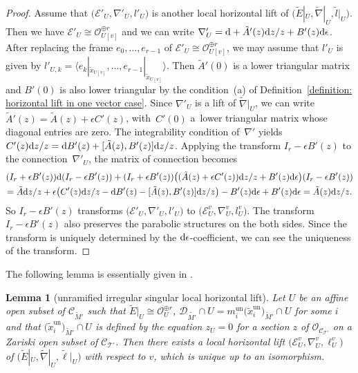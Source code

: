 \documentclass[pdftex]{sigma}
\numberwithin{equation}{section}
\newtheorem{Lemma}[Theorem]{Lemma}
\begin{document}
\begin{proof}
Assume that
$\big({\mathcal E'}_U,\nabla'_U,l'_U\big)$ is another local horizontal lift of
$\big(\tilde{E}|_U,\tilde{\nabla}|_U,\tilde{l}|_U\big)$.
Then we have ${\mathcal E'}_U\cong{\mathcal O}_{U[v]}^{\oplus r}$
and we can write $\nabla'_U={\rm d}+\tilde{A}'(z){\rm d}z/z+B'(z){\rm d}\epsilon$.
After replacing the frame $e_0,\dots,e_{r-1}$
of ${\mathcal E'}_U\cong{\mathcal O}_{U[v]}^{\oplus r}$,
we may assume that $l'_U$ is given by
$l'_{U,k}=\langle e_k|_{\tilde{x}_{U[v]}},\dots,e_{r-1}|_{\tilde{x}_{U[v]}}\rangle$.
Then $\tilde{A}'(0)$ is a lower triangular matrix and
$B'(0)$ is also lower triangular by the condition~(a) of
Definition~\ref{definition: horizontal lift in one vector case}.
Since $\nabla'_U$ is a lift of $\tilde{\nabla}|_U$,
we can write $\tilde{A}'(z)=\tilde{A}(z)+\epsilon C'(z)$,
with~$C'(0)$ a~lower triangular matrix whose diagonal entries are zero.
The integrability condition of~$\nabla'$ yields
$C'(z){\rm d}z/z={\rm d}B'(z)+[\tilde{A}(z),B'(z)]{\rm d}z/z$.
Applying the transform $I_r-\epsilon B'(z)$ to the connection~$\nabla'_U$,
the matrix of connection becomes
\begin{gather*}
 (I_r+\epsilon B'(z)){\rm d}(I_r-\epsilon B'(z))
 +(I_r+\epsilon B'(z))\big( (\tilde{A}(z)+\epsilon C'(z)){\rm d}z/z+B'(z){\rm d}\epsilon \big)(I_r-\epsilon B'(z))
 \\
 =\tilde{A}{\rm d}z/z
 +\epsilon \big( C'(z){\rm d}z/z-{\rm d}B'(z)-[\tilde{A}(z),B'(z)]{\rm d}z/z \big)
 -B'(z){\rm d}\epsilon+B'(z){\rm d}\epsilon
 =\tilde{A}(z){\rm d}z/z.
\end{gather*}
So $I_r-\epsilon B'(z)$ transforms
$\big({\mathcal E'}_U,\nabla'_U,l'_U\big)$
to
$\big({\mathcal E}^v_U,\nabla^v_U,l^v_U\big)$.
The transform $I_r-\epsilon B'(z)$ also preserves the parabolic structures
on the both sides.
Since the transform is uniquely determined by the ${\rm d}\epsilon$-coefficient,
we can see the uniqueness of the transform.
\end{proof}

The following lemma is essentially given in
\cite[Theorem~6.2]{Inaba-Saito}.

\begin{Lemma}[unramified irregular singular local horizontal lift]
\label{lemma: local horizontal lift of unramified connection}
Let $U$ be an affine open subset of ${\mathcal C}_{\tilde{M}'}$
such that
$\tilde{E}|_U\cong{\mathcal O}_U^{\oplus r}$,
${\mathcal D}_{\tilde{M'}}\cap U=m^{\mathrm{un}}_i\big(\tilde{x}^{\mathrm{un}}_i\big)_{\tilde{M}'}\cap U$
for some $i$
and that $\big(\tilde{x}^{\mathrm{un}}_i\big)_{\tilde{M}'}\cap U$ is defined by the equation $z_U=0$
for a section $z$ of ${\mathcal O}_{{\mathcal C}_{\mathcal T'}}$
on a Zariski open subset of ${\mathcal C}_{\mathcal T'}$.
Then there exists a local horizontal lift
$\big({\mathcal E}^v_U,\nabla^v_U, \ell^v_U\big)$
of
$\big(\tilde{E}|_U,\tilde{\nabla}|_U,\tilde{\ell}|_U\big)$
with respect to $v$,
which is unique up to an isomorphism.
\end{Lemma}
\end{document}
